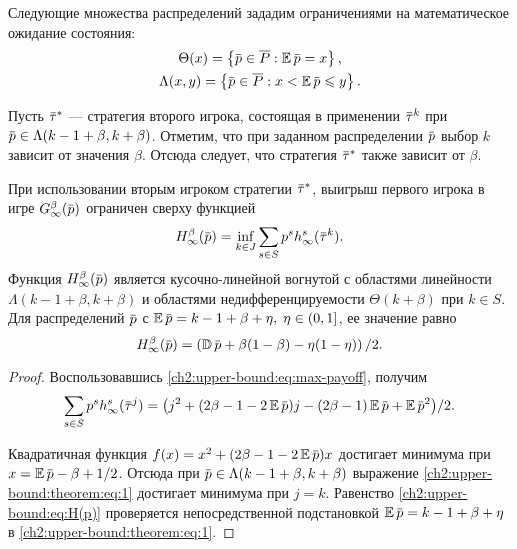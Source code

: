 {Следующие множества распределений зададим ограничениями на математическое ожидание состояния:
\begin{gather*}
  \Theta(x) = \left\{ \p \in \MM: \E \p = x \right\}, \\
  \Lambda(x, y) = \left\{ \p \in \MM: x < \E \p \leqslant y \right\}.
\end{gather*}

Пусть $\tauv^*$ --- стратегия второго игрока, состоящая в применении $\tauv^k$ при $\p \in \Lambda(k-1+\beta,k+\beta)$.
Отметим, что при заданном распределении $\p$ выбор $k$ зависит от значения $\beta$.
Отсюда следует, что стратегия $\tauv^*$ также зависит от $\beta$.

\begin{theorem}
  \label{ch2:upper-bound:theorem}
  При использовании вторым игроком стратегии $\tauv^*$, выигрыш первого игрока в игре
  $\theG[\infty](\p)$ ограничен сверху функцией
  \begin{equation*}
    \High(\p) = \inf_{k \in J} \sum_{s \in S} p^s  h^s_\infty(\tauv^k).
  \end{equation*}
  Функция $\High(\p)$ является кусочно-линейной вогнутой с областями линейности $\Lambda(k - 1 + \beta, k + \beta)$ и областями недифференцируемости $\Theta(k+\beta)$ при $k \in S$.
  Для распределений $\p$ с $\E \p = k - 1 + \beta + \eta, \; \eta \in (0, 1]$, ее значение равно
  \begin{equation}
    \label{ch2:upper-bound:eq:H(p)}
    \High(\p) = \left( \D \p + \beta(1-\beta) - \eta(1-\eta) \right)/2.
  \end{equation}
\end{theorem}
\begin{proof}
  Воспользовавшись \eqref{ch2:upper-bound:eq:max-payoff}, получим
  \begin{equation}
    \label{ch2:upper-bound:theorem:eq:1}
    \begin{gathered}
    \sum_{s \in S} p^s h^s_\infty(\tauv^j) = \bigl(
      j^2 + (2\beta - 1 - 2 \E \p)j - (2\beta - 1) \E \p + \E \p^2 
    \bigr)/2.
    \end{gathered}
  \end{equation}
  
  Квадратичная функция $f(x) = x^2 + (2\beta - 1 - 2\E \p)x$ достигает минимума
  при $x = \E \p - \beta + 1/2$. Отсюда при $\p \in \Lambda(k - 1 + \beta, k +
  \beta)$ выражение \eqref{ch2:upper-bound:theorem:eq:1} достигает минимума при $j =
  k$. Равенство \eqref{ch2:upper-bound:eq:H(p)} проверяется непосредственной
  подстановкой $\E \p = k - 1 + \beta + \eta$ в \eqref{ch2:upper-bound:theorem:eq:1}.
\end{proof}

}
